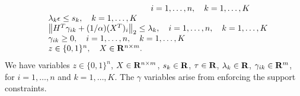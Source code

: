 {{\begin{equation*}
\begin{array}{ll}
	 &\hspace{4cm} \quad i = 1,\dots,n, \quad k = 1,\dots, K\\
	 & \lambda_{k} \epsilon  \leq s_{k}, \quad k = 1,\dots, K\\
	 & \left\| H^T\gamma_{ik} + (1/\alpha)(X^T)_i\right\|_2 \leq \lambda_{k}, \quad i = 1,\dots,n, \quad k = 1,\dots, K\\
	 & \gamma_{ik} \geq 0, \quad i = 1,\dots,n, \quad k = 1,\dots, K\\
	 & z\in \{0,1\}^n, \quad X\in \reals^{n\times m}.
	\end{array}
\end{equation*}
We have variables $z \in \{0,1\}^{n}$, $X \in {\mathbf R}^{n\times m}$, $s_{k} \in {\mathbf R}$, $\tau \in {\mathbf R}$, $\lambda_k \in {\mathbf R}$, $\gamma_{ik} \in {\mathbf R}^{m}$, for $i = 1,\dots,n$ and $k= 1,\dots,K$.
The $\gamma$ variables arise from enforcing the support constraints.}


}
